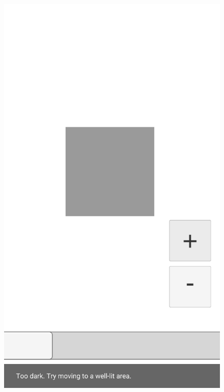 \begin{figure}[htbp]
\begin{minipage}{0.3\textwidth}
        \includegraphics[scale=0.15]{Images/Shaders/profundidad (2).png}\\
    \end{minipage}
    \begin{minipage}{0.3\textwidth}
        \centering

\end{minipage}
\end{figure}
